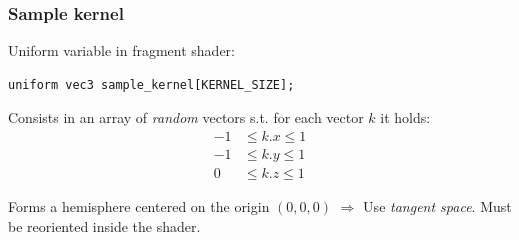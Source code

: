 \documentclass{beamer}
\begin{document}
\begin{frame}[fragile]
\frametitle{Sample kernel}
Uniform variable in fragment shader:
\begin{verbatim}
uniform vec3 sample_kernel[KERNEL_SIZE];
\end{verbatim}

Consists in an array of \emph{random} vectors s.t. for each vector $ k $ it holds:
\begin{align*}
-1 & \le k.x \le 1 \\
-1 & \le k.y \le 1 \\
0 & \le k.z \le 1
\end{align*}

Forms a hemisphere centered on the origin $ (0, 0, 0) $ $ \Rightarrow $ Use \emph{tangent space}. Must be reoriented inside the shader.
\end{frame}
\end{document}
